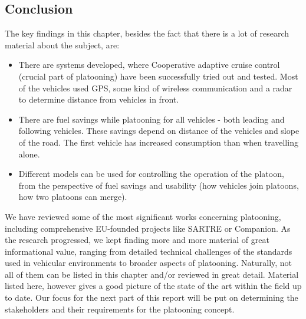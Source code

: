 \subsection{Conclusion}
The key findings in this chapter, besides the fact that there is a lot of research material about the subject, are:
\begin{itemize}[noitemsep]
    \item There are systems developed, where Cooperative adaptive cruise control (crucial part of platooning) have been successfully tried out and tested. Most of the vehicles used GPS, some kind of wireless communication and a radar to determine distance from vehicles in front.
    \item There are fuel savings while platooning for all vehicles - both leading and following vehicles. These savings depend on distance of the vehicles and slope of the road. The first vehicle has increased consumption than when travelling alone.
    \item Different models can be used for controlling the operation of the platoon, from the perspective of fuel savings and usability (how vehicles join platoons, how two platoons can merge).
\end{itemize}
% 
We have reviewed some of the most significant works concerning platooning, including comprehensive EU-founded projects like SARTRE or Companion. As the research progressed, we kept finding more and more material of great informational value, ranging from detailed technical challenges of the standards used in vehicular environments to broader aspects of platooning. Naturally, not all of them can be listed in this chapter and/or reviewed in great detail. Material listed here, however gives a good picture of the state of the art within the field up to date. Our focus for the next part of this report will be put on determining the stakeholders and their requirements for the platooning concept.\par
